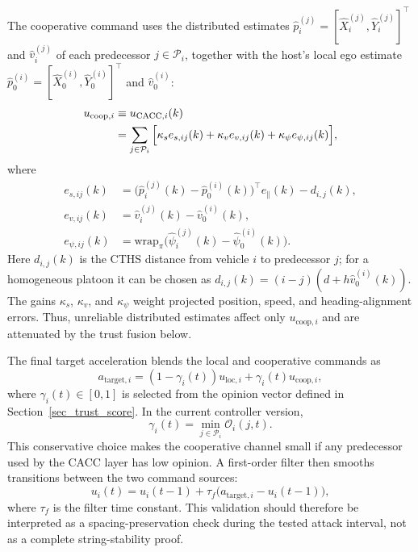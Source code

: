 \documentclass[journal,twoside]{IEEEtran}
\def\O{\mathcal{O}} %
\begin{document}
The cooperative command uses the distributed estimates
$\hat p_i^{(j)}=[\hat X_i^{(j)},\hat Y_i^{(j)}]^\top$ and $\hat v_i^{(j)}$ of each predecessor $j\in\mathcal{P}_i$, together with the host's local ego estimate
$\hat p_0^{(i)}=[\hat X_0^{(i)},\hat Y_0^{(i)}]^\top$ and $\hat v_0^{(i)}$:
\begin{align}
    u_{\mathrm{coop},i}
    &\equiv u_{\text{CACC},i}(k) \notag\\
    &= \sum_{j\in\mathcal{P}_i} \Big[
    \kappa_s e_{s,ij}(k)
    + \kappa_v e_{v,ij}(k)
    + \kappa_{\psi} e_{\psi,ij}(k)\Big],
\end{align}
where
\begin{align*}
    e_{s,ij}(k)&=\big(\hat p_i^{(j)}(k)-\hat p_0^{(i)}(k)\big)^\top e_{\parallel}(k)-d_{i,j}(k),\\
    e_{v,ij}(k)&=\hat{v}_i^{(j)}(k)-\hat{v}_0^{(i)}(k),\\
    e_{\psi,ij}(k)&=\mathrm{wrap}_{\pi}\big(\hat\psi_i^{(j)}(k)-\hat\psi_0^{(i)}(k)\big).
\end{align*}
Here $d_{i,j}(k)$ is the CTHS distance from vehicle $i$ to predecessor $j$; for a homogeneous platoon it can be chosen as $d_{i,j}(k)=(i-j)(d+h\hat{v}_0^{(i)}(k))$. The gains $\kappa_s$, $\kappa_v$, and $\kappa_{\psi}$ weight projected position, speed, and heading-alignment errors. Thus, unreliable distributed estimates affect only $u_{\mathrm{coop},i}$ and are attenuated by the trust fusion below.

The final target acceleration blends the local and cooperative commands as
\begin{equation}
    a_{\text{target},i}=(1-\gamma_i(t))u_{\mathrm{loc},i}+\gamma_i(t)u_{\mathrm{coop},i},
\end{equation}
where $\gamma_i(t)\in[0,1]$ is selected from the opinion vector defined in Section~\ref{sec_trust_score}. In the current controller version,
\begin{equation}
    \gamma_i(t)=\min_{j\in\mathcal{P}_i}\O_i(j,t).
\end{equation}
This conservative choice makes the cooperative channel small if any predecessor used by the CACC layer has low opinion. A first-order filter then smooths transitions between the two command sources:
\begin{equation}
    u_i(t)=u_i(t-1)+\tau_f\big(a_{\text{target},i}-u_i(t-1)\big),
\end{equation}
where $\tau_f$ is the filter time constant.
This validation should therefore be interpreted as a spacing-preservation check during the tested attack interval, not as a complete string-stability proof.
\end{document}
